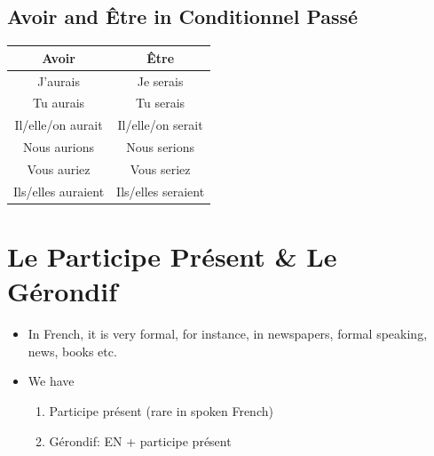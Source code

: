 \documentclass{book}
\begin{document}
    \section{Avoir and Être in Conditionnel Passé}
        \begin{center}
            \begin{tabular}{|c|c|}
                \hline
                \textbf{Avoir} & \textbf{Être} \\
                \hline
                J'aurais & Je serais \\
                \hline
                Tu aurais & Tu serais \\
                \hline
                Il/elle/on aurait & Il/elle/on serait \\
                \hline
                Nous aurions & Nous serions \\
                \hline  
                Vous auriez & Vous seriez \\
                \hline
                Ils/elles auraient & Ils/elles seraient \\
                \hline
            \end{tabular}
        \end{center}
  
\chapter{Le Participe Présent \& Le Gérondif}
    \begin{itemize}
        \item In French, it is very formal, for instance, in newspapers, formal speaking, news, books etc.
        \item We have 
            \begin{enumerate}
                \item Participe présent (rare in spoken French)
                \item Gérondif: EN + participe présent
            \end{enumerate}
    \end{itemize}
\end{document}
